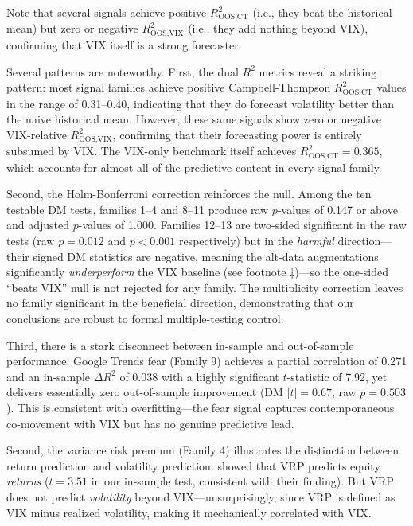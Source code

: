 \documentclass[12pt,a4paper]{article}
\begin{document}
\begin{table}[H]
\begin{threeparttable}
\begin{tablenotes}
\item Note that several signals achieve positive $R^2_{\text{OOS,CT}}$ (i.e., they beat the historical mean) but zero or negative $R^2_{\text{OOS,VIX}}$ (i.e., they add nothing beyond VIX), confirming that VIX itself is a strong forecaster.
\end{tablenotes}
\end{threeparttable}
\end{table}

Several patterns are noteworthy. First, the dual $R^2$ metrics reveal a striking pattern: most signal families achieve positive Campbell-Thompson $R^2_{\text{OOS,CT}}$ values in the range of 0.31--0.40, indicating that they do forecast volatility better than the naive historical mean. However, these same signals show zero or negative VIX-relative $R^2_{\text{OOS,VIX}}$, confirming that their forecasting power is entirely subsumed by VIX. The VIX-only benchmark itself achieves $R^2_{\text{OOS,CT}} = 0.365$, which accounts for almost all of the predictive content in every signal family.

Second, the Holm-Bonferroni correction reinforces the null. Among the ten testable DM tests, families 1--4 and 8--11 produce raw $p$-values of 0.147 or above and adjusted $p$-values of 1.000. Families 12--13 are two-sided significant in the raw tests (raw $p = 0.012$ and $p < 0.001$ respectively) but in the \emph{harmful} direction---their signed DM statistics are negative, meaning the alt-data augmentations significantly \emph{underperform} the VIX baseline (see footnote $\ddagger$)---so the one-sided ``beats VIX'' null is not rejected for any family. The multiplicity correction leaves no family significant in the beneficial direction, demonstrating that our conclusions are robust to formal multiple-testing control.

Third, there is a stark disconnect between in-sample and out-of-sample performance. Google Trends fear (Family 9) achieves a partial correlation of 0.271 and an in-sample $\Delta R^2$ of 0.038 with a highly significant $t$-statistic of 7.92, yet delivers essentially zero out-of-sample improvement (DM $|t| = 0.67$, raw $p = 0.503$). This is consistent with overfitting---the fear signal captures contemporaneous co-movement with VIX but has no genuine predictive lead.

Second, the variance risk premium (Family 4) illustrates the distinction between return prediction and volatility prediction. \citet{bollerslev2009} showed that VRP predicts equity \emph{returns} ($t = 3.51$ in our in-sample test, consistent with their finding). But VRP does not predict \emph{volatility} beyond VIX---unsurprisingly, since VRP is defined as VIX minus realized volatility, making it mechanically correlated with VIX.
\end{document}
